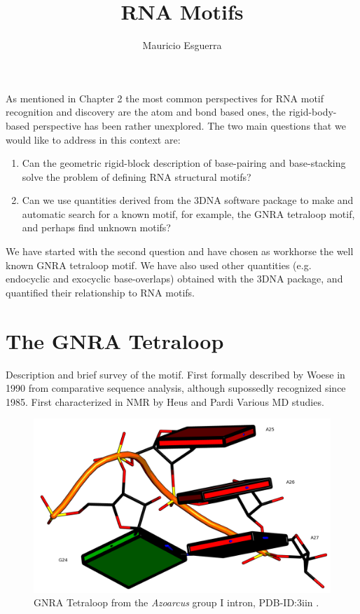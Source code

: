 \documentclass[10pt, oneside, pdftex]{article}
\begin{document}
\title{RNA Motifs}
\author{Mauricio Esguerra}
\maketitle

As mentioned in  Chapter 2 the most common  perspectives for RNA motif
recognition  and  discovery are  the  atom  and  bond based  ones, the
rigid-body-based perspective has been  rather unexplored. The two main
questions that we would like to address in this context are:

\begin{enumerate}
\item{Can  the geometric rigid-block  description of  base-pairing and
  base-stacking solve the problem of defining RNA structural motifs?}
\item{Can we use quantities derived  from the 3DNA software package to
  make and automatic  search for a known motif,  for example, the GNRA
  tetraloop motif, and perhaps find unknown motifs?}
\end{enumerate}

We have  started with  the second  question and have  chosen as
workhorse the well known GNRA tetraloop motif. We have also used other
quantities  (e.g.  endocyclic  and  exocyclic base-overlaps)  obtained
with  the 3DNA  \cite{lu2003, lu2008b}  package, and  quantified their
relationship to RNA motifs.

\section{The GNRA Tetraloop}


Description and brief survey of the motif.
First  formally  described  by  Woese \cite{woese1990}  in  1990  from
comparative  sequence analysis,  although supossedly  recognized since
1985. First characterized in NMR by Heus and Pardi \cite{heus1991}
Various MD studies.
\cite{depaul2010}


\begin{figure}
\centering 
\includegraphics[angle=0, scale=2]{gnra24.png}
\caption{GNRA Tetraloop from the \textit{Azoarcus} group I intron,
  PDB-ID:3iin   \cite{antonioli2010}.}
\end{figure}
\end{document}
